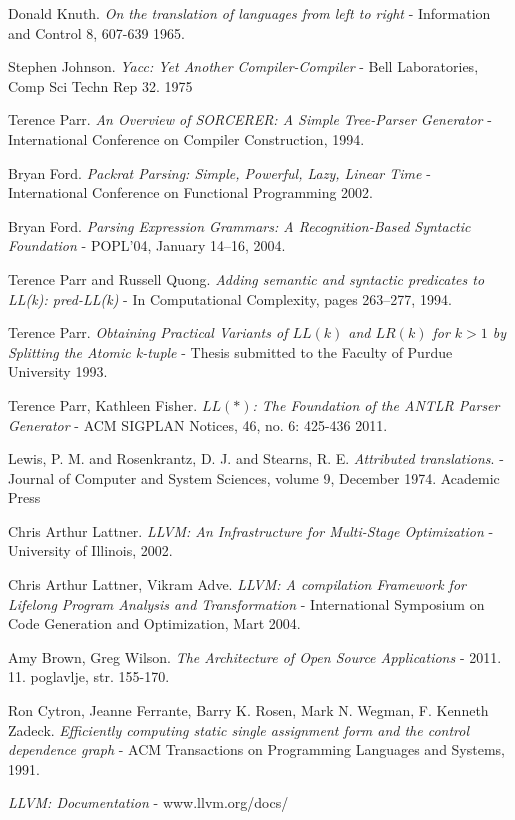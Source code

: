 \begin{thebibliography}{9}

	Donald Knuth.
	\emph{On the translation of languages from left to right}
	- Information and Control 8, 607-639
	1965.

	Stephen Johnson.
	\emph{Yacc: Yet Another Compiler-Compiler}
	- Bell Laboratories, Comp Sci Techn Rep 32. 
	1975

	Terence Parr.
	\emph{An Overview of SORCERER: A Simple Tree-Parser Generator}
	- International Conference on Compiler Construction,
	1994.

	Bryan Ford.
	\emph{Packrat Parsing: Simple, Powerful, Lazy, Linear Time}
	-  International Conference on Functional Programming
	2002.

	Bryan Ford.
	\emph{Parsing Expression Grammars:
A Recognition-Based Syntactic Foundation
}
	-  POPL’04, January 14–16, 2004.

	Terence Parr and Russell Quong.
	\emph{Adding semantic and syntactic predicates to LL(k): pred-LL(k)}
	- In Computational Complexity, pages 263–277,
	1994.

	Terence Parr.
	\emph{Obtaining Practical Variants of $LL(k)$ and $LR(k)$ for $k>1$ by Splitting the Atomic k-tuple}
	- Thesis submitted to the Faculty of Purdue University
	1993.

	Terence Parr, Kathleen Fisher.
	\emph{$LL(*)$: The Foundation of the ANTLR Parser Generator}
	- ACM SIGPLAN Notices, 46, no. 6: 425-436
	2011.

	Lewis, P. M. and Rosenkrantz, D. J. and Stearns, R. E.
	\emph{Attributed translations}.
	- Journal of Computer and System Sciences, 
	volume 9,
	December 1974.
	Academic Press

	Chris Arthur Lattner.
	\emph{LLVM: An Infrastructure for Multi-Stage Optimization}
	- University of Illinois, 2002.
	
	Chris Arthur Lattner, Vikram Adve.
	\emph{LLVM: A compilation Framework for Lifelong Program Analysis and Transformation}
	- International Symposium on Code Generation and Optimization, Mart 2004.
	
	Amy Brown, Greg Wilson.
	\emph{The Architecture of Open Source Applications}
	- 2011. 11. poglavlje, str. 155-170. 

	Ron Cytron, Jeanne Ferrante, Barry K. Rosen, Mark N. Wegman, F. Kenneth Zadeck.
	\emph{Efficiently computing static single assignment form and the control dependence graph}
	- ACM Transactions on Programming Languages and Systems, 1991. 


	\emph{LLVM: Documentation}
	- www.llvm.org/docs/

\end{thebibliography}